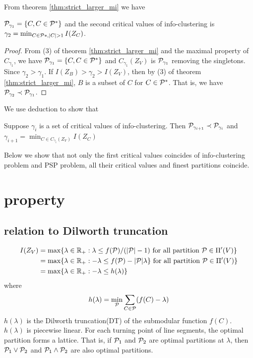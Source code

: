\documentclass{article}
\begin{document}
From theorem \ref{thm:strict_larger_mi} we have 
\begin{theorem}
$\P_{\gamma_1} = \{C, C\in \P^* \}$ and
the second critical values of info-clustering is $\gamma_2 = \min_{C\in \P*, \abs{C}>1} I(Z_C)$.
\end{theorem}
\begin{proof}
From (3) of theorem \ref{thm:strict_larger_mi} and the maximal property of $C_{\gamma_1}$,
we have $\P_{\gamma_1} = \{C, C\in \P^* \}$ and $C_{\gamma_1}(Z_V)$ is $\P_{\gamma_1}$ removing the singletons.
Since $\gamma_2 > \gamma_1$. If $I(Z_B)>\gamma_2 > I(Z_V)$, then by (3) of theorem \ref{thm:strict_larger_mi}, $B$ is a subset of $C$ for $C \in \P^*$. That is, we have $\P_{\gamma_2} \prec \P_{\gamma_1}$. 
\end{proof}
We use deduction to show that
\begin{theorem}
Suppose $\gamma_i$ is a set of critical values of info-clustering. Then
$\P_{\gamma_{i+1}} \prec \P_{\gamma_i}$ and $\gamma_{i+1} = \min_{C \in C_{\gamma_i}(Z_V)}I(Z_C)$
\end{theorem}

Below we show that not only the first critical values coincides of info-clustering problem and PSP problem, all their critical values 
and finest partitions coincide.

\section{property}
\subsection{relation to Dilworth truncation}
\begin{align}
I(Z_V) &= \max\{ \lambda \in \R_+: \lambda \leq f(\P)/(\abs{\P} - 1) \text{ for all partition } \P \in \Pi'(V)\} \\
& = \max\{ \lambda \in \R_+:  -\lambda \leq f(\P) - \abs{\P} \lambda \} \text{ for all partition } \P \in \Pi'(V)\} \\
\label{eq:Connection}& = \max\{ \lambda \in \R_+: -\lambda \leq h(\lambda)\}
\end{align}
where 
\begin{equation}\label{eq:hLambda}
h(\lambda) = \min_{\P} \sum_{C\in \P} (f(C)-\lambda)
\end{equation}
$h(\lambda)$ is the Dilworth truncation(DT) of the submodular function $f(C)$. $h(\lambda)$
is piecewise linear. For each turning point of line segments, the optimal partition forms a lattice. That is, if $\P_1$ and $\P_2$ are optimal partitions at $\lambda$, then $\P_1\vee \P_2$ and $\P_1 \wedge \P_2$ are also optimal partitions.
\end{document}
